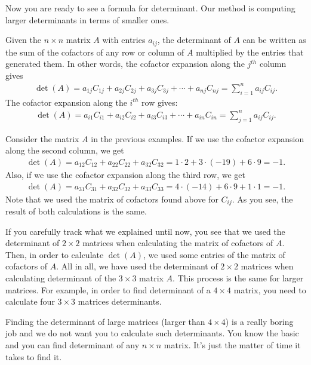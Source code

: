 \documentclass{subfile}
\begin{document}
Now you are ready to see a formula for determinant. Our method is computing larger determinants in terms of smaller ones.

	\begin{definition}
		Given the $n\times n$ matrix $A$ with entries $a_{ij}$, the determinant of $A$ can be written as the sum of the cofactors of any row or column of $A$ multiplied by the entries that generated them. In other words, the cofactor expansion along the $j^{th}$ column gives
		\begin{align*}
		\det(A) = a_{1j}C_{1j} + a_{2j}C_{2j} + a_{3j}C_{3j} + \cdots + a_{nj}C_{nj} = \sum_{i=1}^{n} a_{ij} C_{ij}.
		\end{align*}
		The cofactor expansion along the $i^{th}$ row gives:
		\begin{align*}
		\det(A) = a_{i1}C_{i1} + a_{i2}C_{i2} + a_{i3}C_{i3} + \cdots + a_{in}C_{in} = \sum_{j=1}^{n} a_{ij} C_{ij}.
		\end{align*}
	\end{definition}
	
	\begin{example}
		Consider the matrix $A$ in the previous examples. If we use the cofactor expansion along the second column, we get
		\begin{align*}
			\det(A)=a_{12} C_{12} + a_{22}C_{22} + a_{32} C_{32} = 1 \cdot 2 + 3 \cdot (-19) + 6 \cdot 9 = -1. 
		\end{align*}
		Also, if we use the cofactor expansion along the third row, we get
		\begin{align*}
		\det(A)=a_{31} C_{31} + a_{32}C_{32} + a_{33} C_{33} = 4 \cdot (-14) + 6 \cdot 9 + 1 \cdot 1 = -1. 
		\end{align*}
		Note that we used the matrix of cofactors found above for $C_{ij}$. As you see, the result of both calculations is the same.
	\end{example}

If you carefully track what we explained until now, you see that we used the determinant of $2\times 2$ matrices when calculating the matrix of cofactors of $A$. Then, in order to calculate $\det(A)$, we used some entries of the matrix of cofactors of $A$. All in all, we have used the determinant of $2\times 2$ matrices when calculating determinant of the $3 \times 3$ matrix $A$. This process is the same for larger matrices. For example, in order to find determinant of a $4 \times 4$ matrix, you need to calculate four $3\times 3$ matrices determinants.

Finding the determinant of large matrices (larger than $4 \times 4$) is a really boring job and we do not want you to calculate such determinants. You know the basic and you can find determinant of any $n\times n$ matrix. It's just the matter of time it takes to find it.
\end{document}
